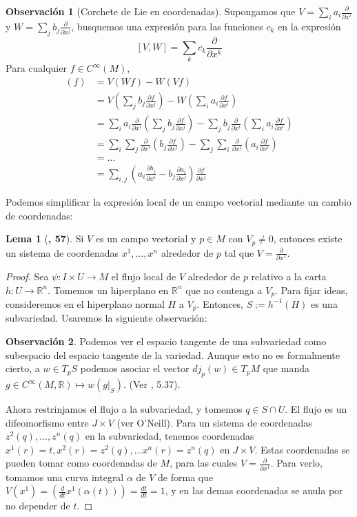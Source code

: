 \documentclass[spanish]{book}
\theoremstyle{definition}
\newtheorem*{lema}{Lema}
\newtheorem*{obs}{Observación}
\newcommand{\R}{\mathbb{R}}
\newcommand{\Cinf}{C^\infty}
\begin{document}
\begin{obs}[Corchete de Lie en coordenadas]
	Supongamos que $V=\sum_ia_i\frac{\partial}{\partial x^i}$ y $W=\sum_jb_j\frac{\partial}{\partial x^j}$, busquemos una expresión para las funciones $c_k$ en la expresión \[[V,W]=\sum_kc_k\frac{\partial}{\partial x^k}\]
	Para cualquier $f\in\Cinf(M)$,
	\begin{align*}
		[V,W](f)&=V(Wf)-W(Vf)\\
		&=V\left(\sum_jb_j\frac{\partial f}{\partial x^j}\right)-W\left(\sum_ia_i\frac{\partial f}{\partial x^i}\right)\\
		&=\sum_ia_i\frac{\partial }{\partial x^i}\left(\sum_jb_j\frac{\partial f}{\partial x^j}\right)-\sum_jb_j\frac{\partial }{\partial x^i}\left(\sum_ia_i\frac{\partial f}{\partial x^i}\right)\\
		&=\sum_i\sum_j\frac{\partial}{\partial x^i}\left(b_j\frac{\partial f}{\partial x^j}\right)-\sum_j\sum_i\frac{\partial}{\partial x^j}\left(a_i\frac{\partial f}{\partial x^i}\right)\\
		&=\ldots\\
		&=\sum_{i,j}\left(a_i\frac{\partial b_j}{\partial x^i}-b_j\frac{\partial a_i}{\partial x^j}\right)\frac{\partial f}{\partial x^j}
	\end{align*}
\end{obs}
Podemos simplificar la expresión local de un campo vectorial mediante un cambio de coordenadas:	
\begin{lema}[\cite{ONeill}\textbf{, 57}]
	Si $V$ es un campo vectorial y $p\in M$ con $V_p\neq0$, entonces existe un sistema de coordenadas $x^1,\ldots,x^n$ alrededor de $p$ tal que $V=\frac{\partial}{\partial x^1}$.
\end{lema}
\begin{proof}
	Sea $\psi:I\times U\to M$ el flujo local de $V$ alrededor de $p$ relativo a la carta $h:U\to\R^n$. Tomemos un hiperplano en $\R^n$ que no contenga a $V_p$. Para fijar ideas, consideremos en el hiperplano normal $H$ a $V_p$. Entonces, $S:=h^{-1}(H)$ es una subvariedad. Usaremos la siguiente observación:
	\begin{obs}
		Podemos ver el espacio tangente de una subvariedad como subespacio del espacio tangente de la variedad. Aunque esto no es formalmente cierto, a $w\in T_pS$ podemos asociar el vector $dj_p(w)\in T_pM$ que manda $g\in\Cinf(M,\R)\mapsto w(g|_S)$. (Ver \cite{Lee}, 5.37).
	\end{obs}
	Ahora restrinjamos el flujo a la subvariedad, y tomemos $q\in S\cap U$. El flujo es un difeomorfismo entre $J\times V$ (ver O'Neill). Para un sistema de coordenadas $z^2(q),\ldots,z^n(q)$ en la subvariedad, tenemos coordenadas $x^1(r)=t,x^2(r)=z^2(q),\ldots x^n(r)=z^n(q)$ en $ J\times V$. Estas coordenadas se pueden tomar como coordenadas de $M$, para las cuales $V=\frac{\partial}{\partial x^1}$. Para verlo, tomamos una curva integral $\alpha$ de $V$ de forma que $V(x^1)=(\frac{d}{dt}x^1(\alpha(t)))=\frac{dt}{dt}=1$, y en las demas coordenadas se anula por no depender de $t$.
\end{proof}
\end{document}
